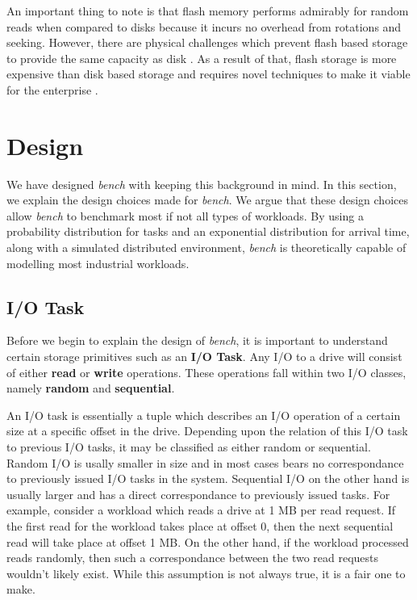 \documentclass[10pt, author, twocolumn]{article}
\begin{document}
An important thing to note is that flash memory performs admirably for random reads when compared to disks because it incurs no overhead from rotations and seeking. However, there are physical challenges which prevent flash based storage to provide the same capacity as disk \cite{}. As a result of that, flash storage is more expensive than disk based storage and requires novel techniques to make it viable for the enterprise \cite{}. 

\section{Design}
We have designed \textit{bench} with keeping this background in mind. In this section, we explain the design choices made for \textit{bench}. We argue that these design choices allow \textit{bench} to benchmark most if not all types of workloads. By using a probability distribution for tasks and an exponential distribution for arrival time, along with a simulated distributed environment, \textit{bench} is theoretically capable of modelling most industrial workloads. 

\subsection{I/O Task}
Before we begin to explain the design of \textit{bench}, it is important to understand certain storage primitives such as an \textbf{I/O Task}. Any I/O to a drive will consist of either \textbf{read} or \textbf{write} operations. These operations fall within two I/O classes, namely \textbf{random} and \textbf{sequential}. 

An I/O task is essentially a tuple which describes an I/O operation of a certain size at a specific offset in the drive. Depending upon the relation of this I/O task to previous I/O tasks, it may be classified as either random or sequential. Random I/O is usally smaller in size and in most cases bears no correspondance to previously issued I/O tasks in the system. Sequential I/O on the other hand is usually larger and has a direct correspondance to previously issued tasks. For example, consider a workload which reads a drive at 1 MB per read request. If the first read for the workload takes place at offset 0, then the next sequential read will take place at offset 1 MB. On the other hand, if the workload processed reads randomly, then such a correspondance between the two read requests wouldn't likely exist. While this assumption is not always true, it is a fair one to make.
\end{document}
